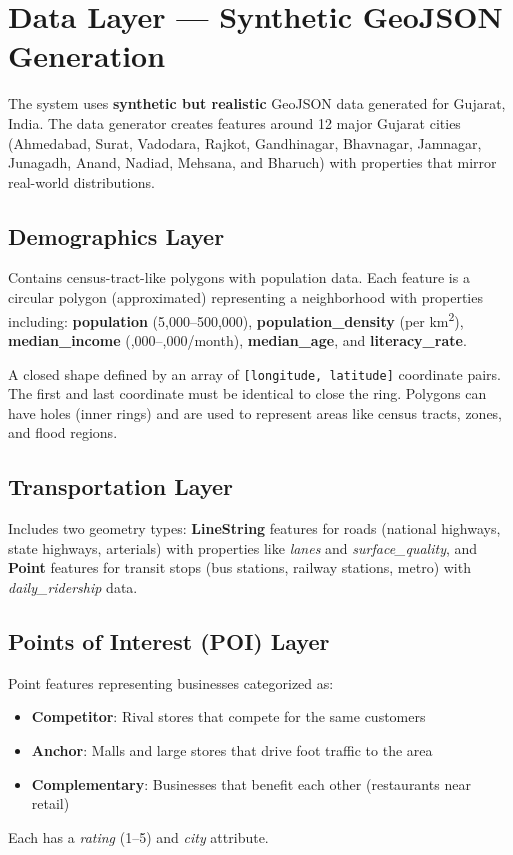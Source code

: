 \documentclass[12pt, a4paper]{article}
\begin{document}
\section{Data Layer — Synthetic GeoJSON Generation}

The system uses \textbf{synthetic but realistic} GeoJSON data generated for Gujarat, India.
The data generator creates features around 12 major Gujarat cities (Ahmedabad, Surat,
Vadodara, Rajkot, Gandhinagar, Bhavnagar, Jamnagar, Junagadh, Anand, Nadiad, Mehsana,
and Bharuch) with properties that mirror real-world distributions.

\subsection{Demographics Layer}

Contains census-tract-like polygons with population data. Each feature is a circular
polygon (approximated) representing a neighborhood with properties including:
\textbf{population} (5,000--500,000), \textbf{population\_density} (per km\textsuperscript{2}),
\textbf{median\_income} (,000--,000/month), \textbf{median\_age}, and
\textbf{literacy\_rate}.

\begin{conceptbox}
    A closed shape defined by an array of \texttt{[longitude, latitude]} coordinate pairs.
    The first and last coordinate must be identical to close the ring. Polygons can have
    holes (inner rings) and are used to represent areas like census tracts, zones, and
    flood regions.
\end{conceptbox}

\subsection{Transportation Layer}

Includes two geometry types: \textbf{LineString} features for roads (national highways,
state highways, arterials) with properties like \textit{lanes} and \textit{surface\_quality},
and \textbf{Point} features for transit stops (bus stations, railway stations, metro)
with \textit{daily\_ridership} data.

\subsection{Points of Interest (POI) Layer}

Point features representing businesses categorized as:
\begin{itemize}[leftmargin=2em]
    \item \textbf{Competitor}: Rival stores that compete for the same customers
    \item \textbf{Anchor}: Malls and large stores that drive foot traffic to the area
    \item \textbf{Complementary}: Businesses that benefit each other (restaurants near retail)
\end{itemize}
Each has a \textit{rating} (1--5) and \textit{city} attribute.
\end{document}
